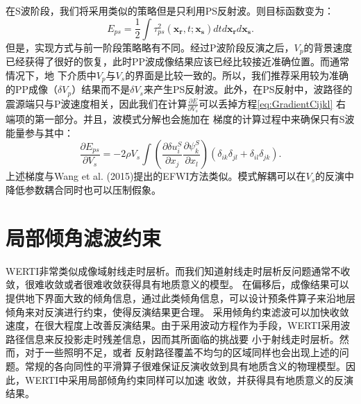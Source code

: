 在S波阶段，我们将采用类似的策略但是只利用PS反射波。则目标函数变为：
\begin{equation}
    E_{ps}=\frac{1}{2}\int\tau^2_{ps}(\mathbf{x_r},t;\mathbf{x_s})dtd\mathbf{x_r}d\mathbf{x_s}.
    \label{eq:ObjectivefunctionPS} 
\end{equation}
但是，实现方式与前一阶段策略略有不同。经过P波阶段反演之后，$V_p$的背景速度已经获得了很好的恢复，此时PP波成像结果应该已经比较接近准确位置。而通常情况下，地
下介质中$V_p$与$V_s$的界面是比较一致的。所以，我们推荐采用较为准确的PP成像（$\delta V_p$）结果而不是$\delta V_s$来产生PS反射波。此外，在PS反射中，波路径的
震源端只与P波速度相关，因此我们在计算$\frac{\partial E}{\partial V_s}$可以丢掉方程\eqref{eq:GradientCijkl} 右端项的第一部分。并且，波模式分解也会施加在
梯度的计算过程中来确保只有S波能量参与其中：
\begin{equation}
    \frac{\partial E_{ps}}{\partial V_s}=-2\rho V_s
    \int (\frac{\partial \delta u^S_{i}}{\partial
    x_j}\frac{\partial \psi^S_{k}}{\partial x_l})
    (\delta_{ik}\delta_{jl}+
    \delta_{il}\delta_{jk}).
    \label{eq:GradientVel}
\end{equation}
上述梯度与Wang et al. (2015)\cite{Wang2015a}提出的EFWI方法类似。模式解耦可以在$V_s$的反演中降低参数耦合同时也可以压制假象。

\section{局部倾角滤波约束}
WERTI非常类似成像域射线走时层析。而我们知道射线走时层析反问题通常不收敛，很难收敛或者很难收敛获得具有地质意义的模型。
在偏移后，成像结果可以提供地下界面大致的倾角信息，通过此类倾角信息，可以设计预条件算子来沿地层倾角来对反演进行约束，使得反演结果更合理。
采用倾角约束滤波可以加快收敛速度，在很大程度上改善反演结果。由于采用波动方程作为手段，WERTI采用波路径信息来反投影走时残差信息，因而其所面临的挑战要
小于射线走时层析。然而，对于一些照明不足，或者
反射路径覆盖不均匀的区域同样也会出现上述的问题。常规的各向同性的平滑算子很难保证反演收敛到具有地质含义的物理模型。因此，WERTI中采用局部倾角约束同样可以加速
收敛，并获得具有地质意义的反演结果。


